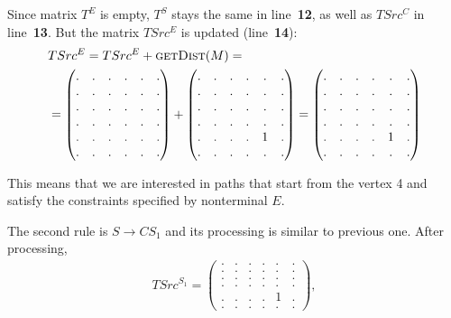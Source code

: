 Since matrix $T^E$ is empty, $T^S$ stays the same in line~\textbf{12}, as well as $TSrc^C$ in line~\textbf{13}.
But the matrix $TSrc^E$ is updated (line~\textbf{14}):
{
    \renewcommand{\arraystretch}{0.7}
    \setlength\arraycolsep{2pt}
\begin{align*}
&TSrc^E = TSrc^E + \textsc{getDist}(M) = \\ &=
\begin{pmatrix}
    . & . & . & . & . & . \\
    . & . & . & . & . & . \\
    . & . & . & . & . & . \\
    . & . & . & . & . & . \\
    . & . & . & . & . & . \\
    . & . & . & . & . & .
\end{pmatrix} +
\begin{pmatrix}
    . & . & . & . & . & . \\
    . & . & . & . & . & . \\
    . & . & . & . & . & . \\
    . & . & . & . & . & . \\
    . & . & . & . & 1 & . \\
    . & . & . & . & . & .
\end{pmatrix}=
\begin{pmatrix}
    . & . & . & . & . & . \\
    . & . & . & . & . & . \\
    . & . & . & . & . & . \\
    . & . & . & . & . & . \\
    . & . & . & . & 1 & . \\
    . & . & . & . & . & .
\end{pmatrix}
\end{align*}
}

This means that we are interested in paths that start from the vertex 4 and satisfy the constraints specified by nonterminal $E$.

The second rule is $S \to C S_1$ and its processing is similar to previous one.
After processing,
{
    \renewcommand{\arraystretch}{0.7}
    \setlength\arraycolsep{2pt}
\begin{align*}
TSrc^{S_1} =
\begin{pmatrix}
    . & . & . & . & . & . \\
    . & . & . & . & . & . \\
    . & . & . & . & . & . \\
    . & . & . & . & . & . \\
    . & . & . & . & 1 & . \\
    . & . & . & . & . & .
\end{pmatrix},
\end{align*}
}

